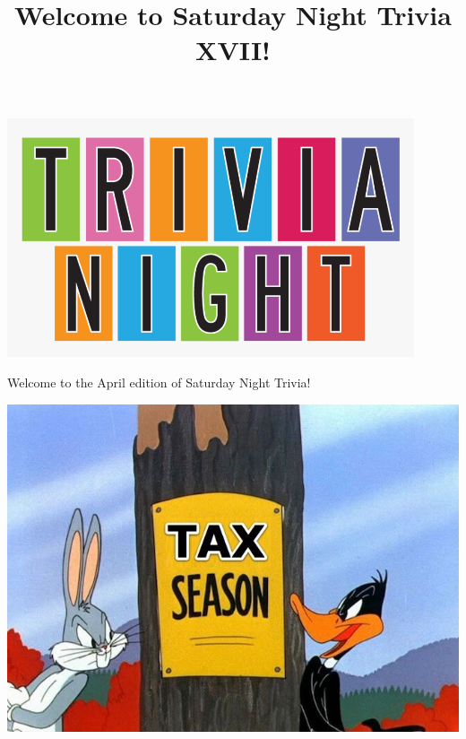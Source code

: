 \documentclass[11pt]{beamer}
\begin{document}
\title{Welcome to Saturday Night Trivia XVII!}
\date{}

\begin{frame}
\titlepage{}
\begin{center}
\includegraphics[max width=0.9\textwidth,
    max height=0.4\textheight]{Images/triviatitleframelogo.png}
\end{center}
\end{frame}

\begin{frame}
Welcome to the April edition of Saturday Night Trivia!
\pause
\begin{center}
\includegraphics[max width=\textwidth,max height=\textheight]{Images/taxseason.jpg}
\end{center}
\end{frame}
\end{document}
